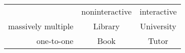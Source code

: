 \documentclass{article}
\begin{document}
            
\begin{tabular}{ r|c|c| }
\multicolumn{1}{r}{}
 &  \multicolumn{1}{c}{noninteractive}
 & \multicolumn{1}{c}{interactive} \\
\cline{2-3}
massively multiple & Library & University \\
\cline{2-3}
one-to-one & Book & Tutor \\
\cline{2-3}
\end{tabular}
\end{document}
